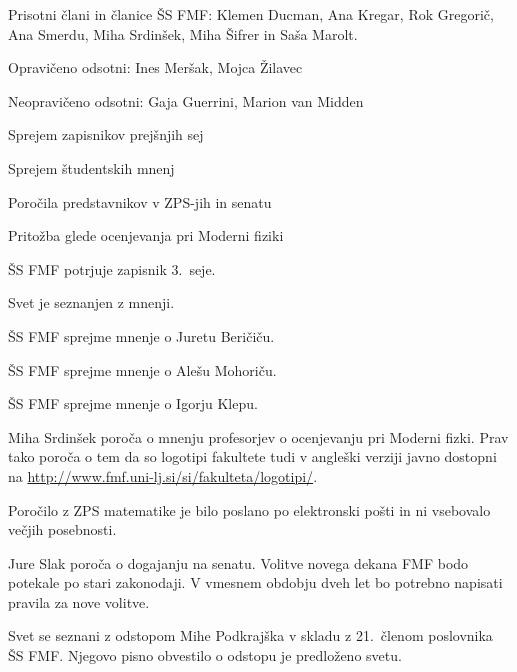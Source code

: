 \documentclass{seja}
\begin{document}
Prisotni člani in članice ŠS FMF: Klemen Ducman, Ana Kregar, Rok Gregorič, Ana Smerdu, Miha Srdinšek, Miha Šifrer in Saša Marolt.

Opravičeno odsotni: Ines Meršak, Mojca Žilavec

Neopravičeno odsotni: Gaja Guerrini, Marion van Midden

\begin{red*}
\item Sprejem zapisnikov prejšnjih sej
\item Sprejem študentskih mnenj
\item Poročila predstavnikov v ZPS-jih in senatu
\item Pritožba glede ocenjevanja pri Moderni fiziki
\end{red*}

\begin{ad}
\item
\begin{sklep*}
  ŠS FMF potrjuje zapisnik 3.~seje.
\end{sklep*}

\item
Svet je seznanjen z mnenji.

\begin{sklep*} ŠS FMF sprejme mnenje o Juretu Beričiču.  \end{sklep*}
\begin{sklep*} ŠS FMF sprejme mnenje o Alešu Mohoriču. \end{sklep*}
\begin{sklep*} ŠS FMF sprejme mnenje o Igorju Klepu. \end{sklep*}

\item Miha Srdinšek poroča o mnenju profesorjev o ocenjevanju pri Moderni fizki.
Prav tako poroča o tem da so logotipi fakultete tudi v angleški verziji javno dostopni na
\url{http://www.fmf.uni-lj.si/si/fakulteta/logotipi/}.

Poročilo z ZPS matematike je bilo poslano po elektronski pošti in ni vsebovalo večjih posebnosti.

Jure Slak poroča o dogajanju na senatu. Volitve novega dekana FMF bodo potekale po stari zakonodaji.
V vmesnem obdobju dveh let bo potrebno napisati pravila za nove volitve.

\item Svet se seznani z odstopom Mihe Podkrajška v skladu z 21.~členom poslovnika ŠS FMF.
Njegovo pisno obvestilo o odstopu je predloženo svetu.


\end{ad}
\end{document}
